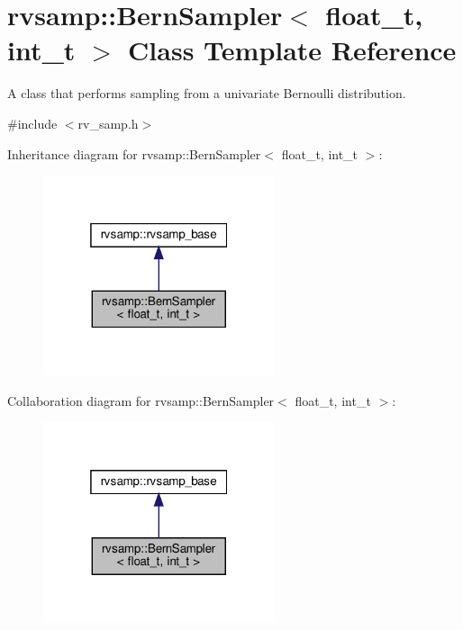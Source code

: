 \hypertarget{classrvsamp_1_1BernSampler}{}\section{rvsamp\+:\+:Bern\+Sampler$<$ float\+\_\+t, int\+\_\+t $>$ Class Template Reference}
\label{classrvsamp_1_1BernSampler}


A class that performs sampling from a univariate Bernoulli distribution.  




{\ttfamily \#include $<$rv\+\_\+samp.\+h$>$}



Inheritance diagram for rvsamp\+:\+:Bern\+Sampler$<$ float\+\_\+t, int\+\_\+t $>$\+:
\nopagebreak
\begin{figure}[H]
\begin{center}
\leavevmode
\includegraphics[width=193pt]{classrvsamp_1_1BernSampler__inherit__graph}
\end{center}
\end{figure}


Collaboration diagram for rvsamp\+:\+:Bern\+Sampler$<$ float\+\_\+t, int\+\_\+t $>$\+:
\nopagebreak
\begin{figure}[H]
\begin{center}
\leavevmode
\includegraphics[width=193pt]{classrvsamp_1_1BernSampler__coll__graph}
\end{center}
\end{figure}
